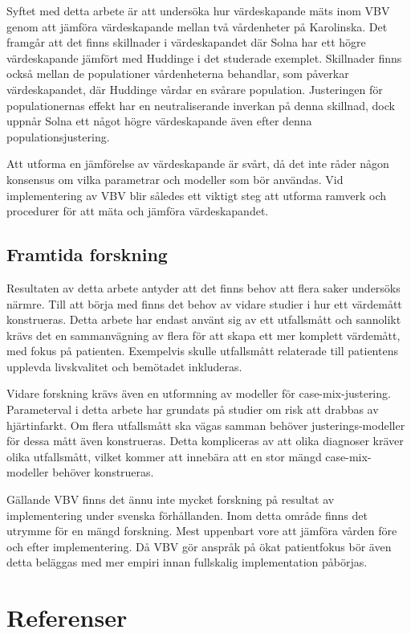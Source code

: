 Syftet med detta arbete är att undersöka hur värdeskapande mäts inom VBV genom att jämföra värdeskapande mellan två vårdenheter på Karolinska. Det framgår att det finns skillnader i värdeskapandet där Solna har ett högre värdeskapande jämfört med Huddinge i det studerade exemplet. Skillnader finns också mellan de populationer vårdenheterna behandlar, som påverkar värdeskapandet, där Huddinge vårdar en svårare population. Justeringen för populationernas effekt har en neutraliserande inverkan på denna skillnad, dock uppnår Solna ett något högre värdeskapande även efter denna populationsjustering.

Att utforma en jämförelse av värdeskapande är svårt, då det inte råder någon konsensus om vilka parametrar och modeller som bör användas. Vid implementering av VBV blir således ett viktigt steg att utforma ramverk och procedurer för att mäta och jämföra värdeskapandet. 

\subsection{Framtida forskning}

Resultaten av detta arbete antyder att det finns behov att flera saker undersöks närmre. Till att börja med finns det behov av vidare studier i hur ett värdemått konstrueras. Detta arbete har endast använt sig av ett utfallsmått och sannolikt krävs det en sammanvägning av flera för att skapa ett mer komplett värdemått, med fokus på patienten. Exempelvis skulle utfallsmått relaterade till patientens upplevda livskvalitet och bemötadet inkluderas.

Vidare forskning krävs även en utformning av modeller för case-mix-justering. Parameterval i detta arbete har grundats på studier om risk att drabbas av hjärtinfarkt. Om flera utfallsmått ska vägas samman behöver justerings-modeller för dessa mått även konstrueras. Detta kompliceras av att olika diagnoser kräver olika utfallsmått, vilket kommer att innebära att en stor mängd case-mix-modeller behöver konstrueras.

Gällande VBV finns det ännu inte mycket forskning på resultat av implementering under svenska förhållanden. Inom detta område finns det utrymme för en mängd forskning. Mest uppenbart vore att jämföra vården före och efter implementering. Då VBV gör anspråk på ökat patientfokus bör även detta beläggas med mer empiri innan fullskalig implementation påbörjas.

\section{Referenser}
\setlength{\parindent}{0cm}

